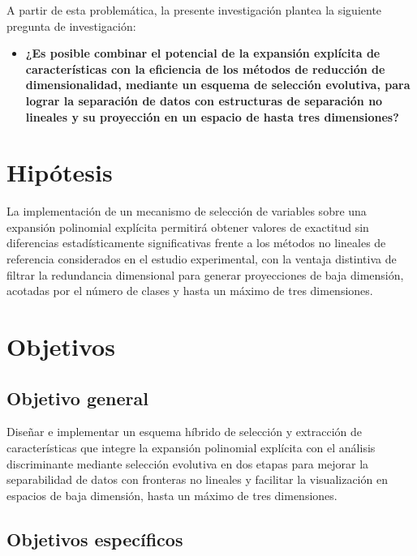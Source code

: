 A partir de esta problemática, la presente investigación plantea la siguiente pregunta de
investigación:

\begin{itemize}
	\item \textbf{¿Es posible combinar el potencial de la expansión explícita de características con la
		eficiencia de los métodos de reducción de dimensionalidad, mediante un esquema de
		selección evolutiva, para lograr la separación de datos con estructuras de separación no
		lineales y su proyección en un espacio de hasta tres dimensiones?}
	

\end{itemize}



\section{Hipótesis}
\label{sec:Hipótesis}

La implementación de un mecanismo de selección de variables sobre una expansión
polinomial explícita permitirá obtener valores de exactitud sin diferencias estadísticamente
significativas frente a los métodos no lineales de referencia considerados en el estudio
experimental, con la ventaja distintiva de filtrar la redundancia dimensional para generar proyecciones de baja dimensión, acotadas por el número de clases y hasta un máximo de tres dimensiones.

\section{Objetivos}
\label{sec:Objetivo-General}

\subsection{Objetivo general}

Diseñar e implementar un esquema híbrido de selección y extracción de características que
integre la expansión polinomial explícita con el análisis discriminante mediante selección
evolutiva en dos etapas para mejorar la separabilidad de datos con fronteras no lineales y
facilitar la visualización en espacios de baja dimensión, hasta un máximo de tres
dimensiones.

\subsection{Objetivos específicos}

